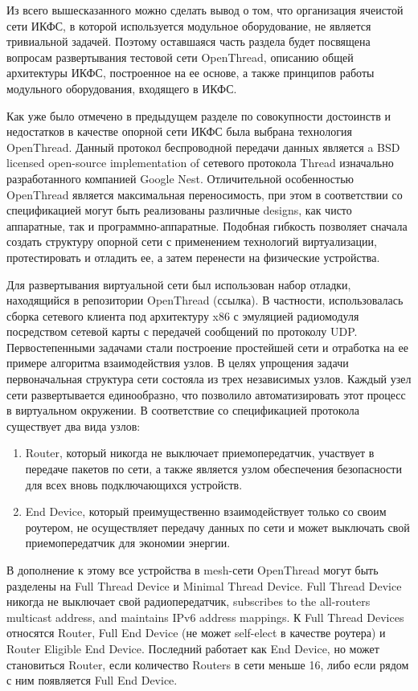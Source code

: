 Из всего вышесказанного можно сделать вывод о том, что организация ячеистой сети ИКФС, в которой используется модульное оборудование, не является тривиальной задачей. Поэтому оставшаяся часть раздела будет посвящена вопросам развертывания тестовой сети OpenThread, описанию общей архитектуры ИКФС, построенное на ее основе, а также принципов работы модульного оборудования, входящего в ИКФС.

Как уже было отмечено в предыдущем разделе по совокупности достоинств и недостатков в качестве опорной сети ИКФС была выбрана технология OpenThread. Данный протокол беспроводной передачи данных является a BSD licensed open-source implementation of сетевого протокола Thread изначально разработанного компанией Google Nest. Отличительной особенностью OpenThread является максимальная переносимость, при этом в соответствии со спецификацией  могут быть реализованы различные designs, как чисто аппаратные, так и программно-аппаратные. Подобная гибкость позволяет сначала создать структуру опорной сети с применением технологий виртуализации, протестировать и отладить ее, а затем перенести на физические устройства.

Для развертывания виртуальной сети был использован набор отладки, находящийся в репозитории OpenThread (ссылка). В частности, 	использовалась сборка сетевого клиента под архитектуру x86 с эмуляцией радиомодуля посредством сетевой карты с передачей сообщений по протоколу UDP. Первостепенными задачами стали построение простейшей сети и отработка на ее примере алгоритма взаимодействия узлов. В целях упрощения задачи первоначальная структура сети состояла из трех независимых узлов. Каждый узел сети развертывается единообразно, что позволило автоматизировать этот процесс в виртуальном окружении.
В соответствие со спецификацией протокола существует два вида узлов: 

\begin{enumerate}
	\item Router, который никогда не выключает приемопередатчик, участвует в передаче пакетов по сети, а также является узлом обеспечения безопасности для всех вновь подключающихся устройств.
	\item End Device, который преимущественно взаимодействует только со своим роутером, не осуществляет передачу данных по сети и может выключать свой приемопередатчик для экономии энергии.
\end{enumerate}

В дополнение к этому все устройства в mesh-сети OpenThread могут быть разделены на Full Thread Device и Minimal Thread Device. Full Thread Device никогда не выключает свой радиопередатчик, subscribes to the all-routers multicast address, and maintains IPv6 address mappings. К Full Thread Devices относятся Router, Full End Device (не может self-elect в качестве роутера) и Router Eligible End Device. Последний работает как End Device, но может становиться Router, если количество Routers в сети меньше 16, либо если рядом с ним появляется Full End Device.

